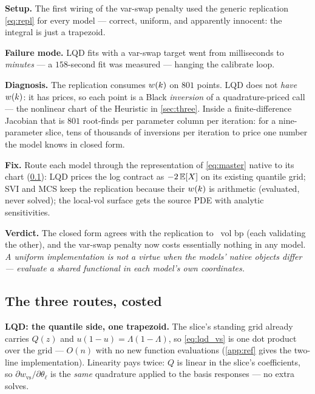 \documentclass[11pt]{article}
\newcommand{\wvs}{w_{\mathrm{vs}}}
\newcommand{\Lo}{\Lambda}
\begin{document}
\begin{example}[title={Case file: the fit that took minutes}]
\textbf{Setup.}  The first wiring of the var-swap penalty used the
generic replication \eqref{eq:repl} for every model --- correct, uniform,
and apparently innocent: the integral is just a trapezoid.

\textbf{Failure mode.}  LQD fits with a var-swap target went from
milliseconds to \emph{minutes} --- a $158$-second fit was measured ---
hanging the calibrate loop.

\textbf{Diagnosis.}  The replication consumes $w(k)$ on $801$
points.  LQD does not \emph{have} $w(k)$: it has prices, so each
point is a Black \emph{inversion} of a quadrature-priced call --- the
nonlinear chart of the Heuristic in \cref{sec:three}.  Inside a
finite-difference Jacobian that is $801$ root-finds per parameter column
per iteration: for a nine-parameter slice, tens of thousands of
inversions per iteration to price one number the model knows in closed
form.

\textbf{Fix.}  Route each model through the representation of
\eqref{eq:master} native to its chart (\cref{sec:routes}): LQD prices
the log contract as $-2\,\mathbb{E}[X]$ on its existing quantile grid; SVI and
MCS keep the replication because their $w(k)$ is arithmetic
(evaluated, never solved); the local-vol surface gets the source PDE
with analytic sensitivities.

\textbf{Verdict.}  The closed form agrees with the replication to
\vsragreebp\ vol bp (each validating the other), and the var-swap
penalty now costs essentially nothing in any model.  \emph{A uniform
implementation is not a virtue when the models' native objects differ
--- evaluate a shared functional in each model's own coordinates.}
\end{example}

\subsection{The three routes, costed}
\label{sec:routes}

\textbf{LQD: the quantile side, one trapezoid.}  The slice's standing
grid already carries $Q(z)$ and $u(1-u)=\Lo(1-\Lo)$, so
\eqref{eq:lqd_vs} is one dot product over the grid --- $O(n)$ with no
new function evaluations (\cref{app:ref} gives the two-line
implementation).  Linearity pays twice: $Q$ is linear in the slice's
coefficients, so $\partial\wvs/\partial\theta_\ell$ is the \emph{same}
quadrature applied to the basis responses --- no extra solves.
\end{document}
